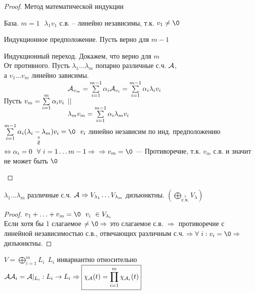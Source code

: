 \documentclass[../main.tex]{subfiles}
\begin{document}
	\begin{proof} Метод математической индукции
		\begin{mylist}
			\item База. $m=1 \ \ \ \lambda_1 v_1$ с.в. -- линейно независимы, т.к. $v_1\neq \0$
			\item Индукционное предположение. Пусть верно для $m-1$
			\item Индукционный переход. Докажем, что верно для $m$\\
			От противного. Пусть $\lambda_1\ldots \lambda_m $ попарно различные с.ч. $\A$,\\
			а $v_1\ldots v_m$ линейно зависимы.\\
			Пусть $v_m = \sum\limits_{i=1}^{m}\alpha_i v_i\\
			\begin{array}{l}
			\A_{v_m} = \sum\limits_{i=1}^{m-1}\alpha_i \A_{v_i} = \sum\limits_{i=1}^{m-1} \alpha_i \lambda_i v_i\\
			
			||
			\\
			\lambda_m v_m = \sum\limits_{i=1}^{m-1} \alpha_i \lambda_m v_i
			\end{array}$\\
			$\sum\limits_{i=1}^{m-1}\alpha_i(\underset{\stackrel{0}{\nparallel}}{\lambda_i - \lambda_m})v_i = \0 \ \ v_i$ линейно независим по инд. предположению\\
			$\Leftrightarrow \alpha_i = 0 \ \ \forall \ i=1\ldots m-1 \Rightarrow\\
			\Rightarrow v_m = \0$ --- Противоречие, т.к. $v_m$ с.в. и значит не может быть $\0$
		\end{mylist}
	\end{proof}
	\begin{corollary}
		$\lambda_1\ldots\lambda_m$ различные с.ч. $\A
		\Rightarrow  V_{\lambda_1}\ldots V_{\lambda_m}$ дизъюнктны.
		$\left(\bigoplus\limits_{\stackrel{\lambda}{\text{с.ч.}}} V_\lambda\right)$ 
	\end{corollary}
	\begin{proof}
		$v_1 + \ldots +v_m = \0 \ \ v_i\ \in V_{\lambda_i}$\\
		Если хотя бы 1 слагаемое $\neq \0 \Rightarrow$ это слагаемое с.в. $\Rightarrow$ противоречие с линейной независимостью с.в., отвечающих различным с.ч. $\Rightarrow \forall \ i: v_i = \0 \Rightarrow$ дизъюнктны. 
	\end{proof}
	\begin{theorem}
		$V = \bigoplus\limits_{i=1}^m L_i \ \ L_i$ инвариантно относительно $\A\\
		\A_i = \A|_{L_i} : L_i \rightarrow L_i
		\Rightarrow \boxed{\chi_\A(t) = \prod_{i=1}^{m}\chi_{\A_i}(t)}$
	\end{theorem}
\end{document}
